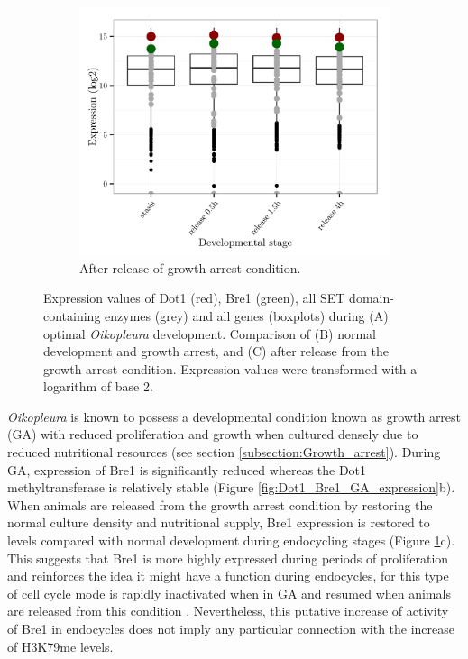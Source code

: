 \documentclass[11pt,twoside,a4paper]{report}
\begin{document}
\begin{figure}[h!]
\begin{subfigure}{.5\textwidth}
			\includegraphics[width=1\linewidth]{pngs/stasisRelease_Dot1_expression_allgenes_SETs.png}
			\caption{After release of growth arrest condition.}
		\end{subfigure}		
		\caption[Expression values of Dot1 and Bre1 enzymes during optimal \textit{Oikopleura} development]
		{Expression values of Dot1 (red), Bre1 (green), all SET domain-containing enzymes (grey) and all genes (boxplots) during (A) optimal \textit{Oikopleura} development. Comparison of (B) normal development and growth arrest, and (C) after release from the growth arrest condition.
		{\footnotesize
			Expression values were transformed with a logarithm of base 2.
			}
		}		
		\label{fig:Dot1_Bre1_expression}
	\end{figure}
	
	\textit{Oikopleura} is known to possess a developmental condition known as growth arrest (GA) with reduced proliferation and growth when cultured densely due to reduced nutritional resources (see section \ref{subsection:Growth_arrest}). During GA, expression of Bre1 is significantly reduced whereas the Dot1 methyltransferase is relatively stable (Figure \ref{fig:Dot1_Bre1_GA_expression}b). When animals are released from the growth arrest condition by restoring the normal culture density and nutritional supply, Bre1 expression is restored to levels compared with normal development during endocycling stages (Figure \ref{fig:Dot1_Bre1_expression}c). This suggests that Bre1 is more highly expressed during periods of proliferation and reinforces the idea it might have a function during endocycles, for this type of cell cycle mode is rapidly inactivated when in GA and resumed when animals are released from this condition \cite{Subramaniam2014}. Nevertheless, this putative increase of activity of Bre1 in endocycles does not imply any particular connection with the increase of H3K79me levels.
	
\end{document}
